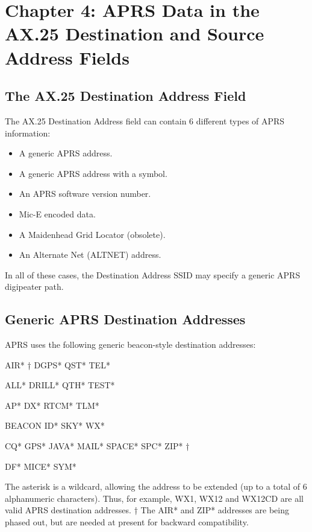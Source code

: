 \chapter{Chapter 4: APRS Data in the AX.25 Destination and Source Address Fields}


\section{The AX.25 Destination Address Field}

The AX.25 Destination Address field can contain 6 different types of APRS
information:

\begin{itemize}

\item A generic APRS address.

\item A generic APRS address with a symbol.

\item An APRS software version number.

\item Mic-E encoded data.

\item A Maidenhead Grid Locator (obsolete).

\item An Alternate Net (ALTNET) address.

\end{itemize}

In all of these cases, the Destination Address SSID may specify a generic
APRS digipeater path.

\section {Generic APRS Destination Addresses}

APRS uses the following generic beacon-style destination addresses:


AIR* †
DGPS*
QST*
TEL*

ALL*
DRILL*
QTH*
TEST*

AP*
DX*
RTCM*
TLM*

BEACON
ID*
SKY*
WX*

CQ*
GPS*
JAVA* MAIL*
SPACE* SPC*
ZIP* †

DF*
MICE*
SYM*


The asterisk is a wildcard, allowing the address to be extended (up to a total
of 6 alphanumeric characters). Thus, for example, WX1, WX12 and WX12CD
are all valid APRS destination addresses.
† The AIR* and ZIP* addresses are being phased out, but are needed at
present for backward compatibility.

